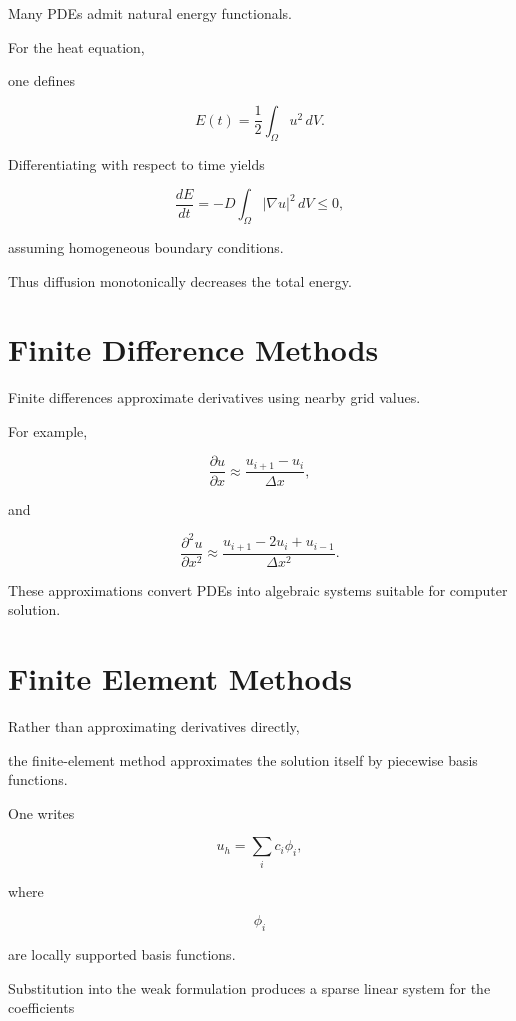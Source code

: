\documentclass[11pt,fleqn]{book}
\numberwithin{equation}{chapter}
\theoremstyle{plain}
\theoremstyle{definition}
\theoremstyle{remark}
\begin{document}
Many PDEs admit natural energy functionals.

For the heat equation,

one defines

\[
\boxed{
E(t)
=
\frac12
\int_\Omega
u^2\,dV.
}
\]

Differentiating with respect to time yields

\[
\boxed{
\frac{dE}{dt}
=
-
D
\int_\Omega
|\nabla u|^2
\,dV
\le
0,
}
\]

assuming homogeneous boundary conditions.

Thus diffusion monotonically decreases the total energy.


\section{Finite Difference Methods}

Finite differences approximate derivatives using nearby grid values.

For example,

\[
\boxed{
\frac{\partial u}{\partial x}
\approx
\frac{
u_{i+1}-u_i
}
{\Delta x},
}
\]

and

\[
\boxed{
\frac{\partial^2u}{\partial x^2}
\approx
\frac{
u_{i+1}
-
2u_i
+
u_{i-1}
}
{\Delta x^2}.
}
\]

These approximations convert PDEs into algebraic systems suitable for
computer solution.


\section{Finite Element Methods}

Rather than approximating derivatives directly,

the finite-element method approximates the solution itself by piecewise
basis functions.

One writes

\[
\boxed{
u_h
=
\sum_i
c_i
\phi_i,
}
\]

where

\[
\phi_i
\]

are locally supported basis functions.

Substitution into the weak formulation produces a sparse linear system
for the coefficients
\end{document}
